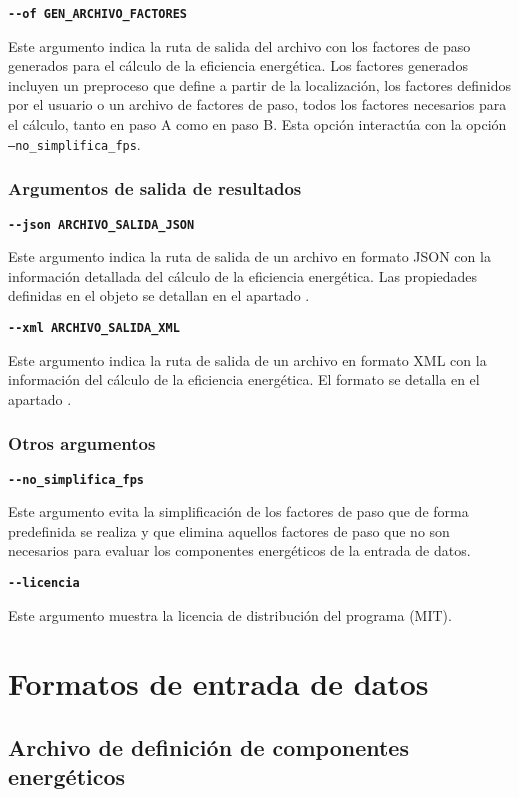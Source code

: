 \documentclass[10pt,notitlepage,oneside,a4paper]{article}
\begin{document}
\textbf{\texttt{-{}-of GEN\_ARCHIVO\_FACTORES}}

Este argumento indica la ruta de salida del archivo con los factores de paso generados para el cálculo de la eficiencia energética. Los factores generados incluyen un preproceso que define a partir de la localización, los factores definidos por el usuario o un archivo de factores de paso, todos los factores necesarios para el cálculo, tanto en paso A como en paso B. Esta opción interactúa con la opción \texttt{--no\_simplifica\_fps}.

\subsubsection{Argumentos de salida de resultados}

\textbf{\texttt{-{}-json ARCHIVO\_SALIDA\_JSON}}

Este argumento indica la ruta de salida de un archivo en formato JSON con la información detallada del cálculo de la eficiencia energética. Las propiedades definidas en el objeto se detallan en el apartado .

\textbf{\texttt{-{}-xml ARCHIVO\_SALIDA\_XML}}

Este argumento indica la ruta de salida de un archivo en formato XML con la información del cálculo de la eficiencia energética. El formato se detalla en el apartado .

\subsubsection{Otros argumentos}

\textbf{\texttt{-{}-no\_simplifica\_fps}}

Este argumento evita la simplificación de los factores de paso que de forma predefinida se realiza y que elimina aquellos factores de paso que no son necesarios para evaluar los componentes energéticos de la entrada de datos.

\textbf{\texttt{-{}-licencia}}

Este argumento muestra la licencia de distribución del programa (MIT).

\clearpage
\newpage
\section{Formatos de entrada de datos}

\subsection{Archivo de definición de componentes energéticos}\label{sec:formatocomponentes}
\end{document}
